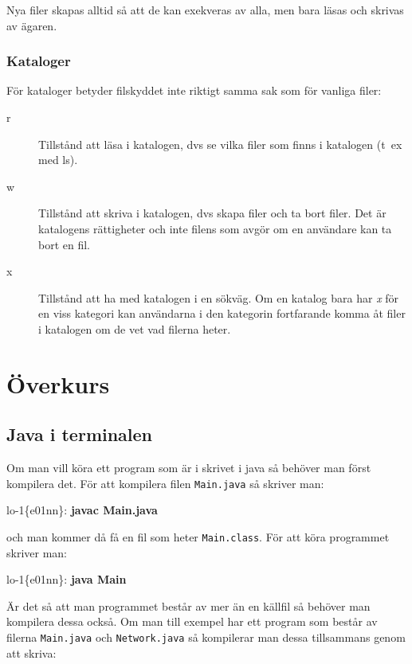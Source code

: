 \documentclass[a4paper,twocolumn]{book}
\begin{document}
Nya filer skapas alltid så att de kan exekveras av alla, men
bara läsas och skrivas av ägaren.

\subsection{Kataloger}

För kataloger betyder filskyddet inte riktigt
samma sak som för vanliga filer:
\begin{description}
\item[r] Tillstånd att läsa i katalogen, dvs se vilka filer som finns
  i katalogen (t~ex med ls).
\item[w] Tillstånd att skriva i katalogen, dvs skapa filer och ta bort
  filer. Det är katalogens rättigheter och inte filens som avgör om en
  användare kan ta bort en fil.
\item[x] Tillstånd att ha med katalogen i en sökväg. Om en katalog
  bara har \emph{x} för en viss kategori kan användarna i den
  kategorin fortfarande komma åt filer i katalogen om de vet vad
  filerna heter.
\end{description}


\chapter{Överkurs}
\label{cha:overkurs}

\section{Java i terminalen}
Om man vill köra ett program som är i skrivet i java så behöver man först kompilera det.
För att kompilera filen \texttt{Main.java} så skriver man:
\begin{example}
lo-1\{e01nn\}: \textbf{javac Main.java}
\end{example}
och man kommer då få en fil som heter \texttt{Main.class}.
För att köra programmet skriver man:
\begin{example}
lo-1\{e01nn\}: \textbf{java Main}
\end{example}

Är det så att man programmet består av mer än en källfil
så behöver man kompilera dessa också. Om man till exempel har ett program
som består av filerna \texttt{Main.java} och \texttt{Network.java} så
kompilerar man dessa tillsammans genom att skriva:
\end{document}
